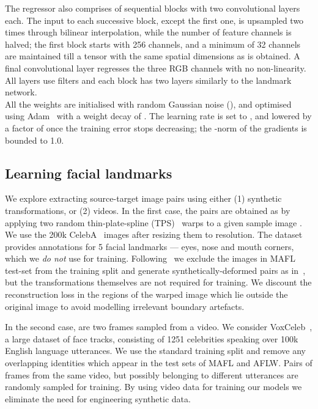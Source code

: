 \documentclass{article}
\makeatletter
\renewcommand{\paragraph}{\@startsection{paragraph}{4}{\z@}{0em}{-1em}{\normalfont\normalsize\bfseries}}
\makeatother
\begin{document}
The regressor also comprises of sequential blocks with two convolutional layers each. The input to each successive block, except the first one, is upsampled two times through bilinear interpolation, while the number of feature channels is halved; the first block starts with 256 channels, and a minimum of 32 channels are maintained till a tensor with the same spatial dimensions as  is obtained. A final convolutional layer regresses the three RGB channels with no non-linearity. All layers use  filters and each block has two layers similarly to the landmark network.\\
All the weights are initialised with random Gaussian noise (), and optimised using Adam~\citep{Kingma14} with a weight decay of . The learning rate is set to , and lowered by a factor of  once the training error stops decreasing; the -norm of the gradients is bounded to 1.0.


\subsection{Learning facial landmarks}\label{s:facialkpt}
\paragraph{Setup.}

We explore extracting source-target image pairs  using either (1) synthetic transformations, or (2) videos. In the first case, the pairs are obtained as  by applying two random thin-plate-spline (TPS)~\citep{duchon1977splines,wahba1990spline} warps  to a given sample image . We use the 200k CelebA~\citep{liu2015faceattributes} images after resizing them to  resolution. The dataset provides annotations for 5 facial landmarks --- eyes, nose and mouth corners, which we \emph{do not} use for training. Following~\cite{thewlis17unsupervised} we exclude the images in MAFL~\citep{Zhang2016} test-set from the training split and generate synthetically-deformed pairs as in~\citep{thewlis17unsupervised,zhang2018unsupervised}, but the transformations themselves are not required for training. We discount the reconstruction loss in the regions of  the warped image which lie outside the original image to avoid modelling irrelevant boundary artefacts.

In the second case,  are two frames sampled from a video. We consider VoxCeleb~\citep{Nagrani17}, a large dataset of face tracks, consisting of 1251 celebrities speaking over 100k English language utterances. We use the standard training split and remove any overlapping identities which appear in the test sets of MAFL and AFLW. Pairs of frames from the same video, but possibly belonging to different utterances are randomly sampled for training. By using video data for training our models we eliminate the need for engineering synthetic data.
\end{document}

